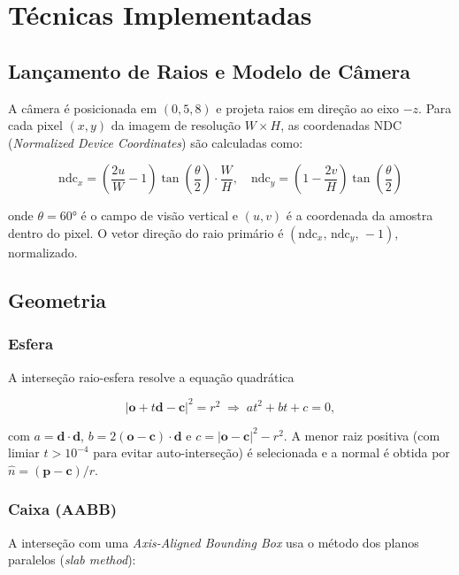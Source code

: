 \documentclass[12pt,a4paper]{article}
\begin{document}
\section{Técnicas Implementadas}

\subsection{Lançamento de Raios e Modelo de Câmera}

A câmera é posicionada em $(0, 5, 8)$ e projeta raios em direção ao
eixo $-z$. Para cada pixel $(x, y)$ da imagem de resolução
$W \times H$, as coordenadas NDC (\textit{Normalized Device Coordinates})
são calculadas como:

\[
  \text{ndc}_x = \left(\frac{2u}{W} - 1\right) \tan\!\left(\frac{\theta}{2}\right)\cdot\frac{W}{H},
  \quad
  \text{ndc}_y = \left(1 - \frac{2v}{H}\right) \tan\!\left(\frac{\theta}{2}\right)
\]

onde $\theta = 60°$ é o campo de visão vertical e $(u, v)$ é a
coordenada da amostra dentro do pixel. O vetor direção do raio primário
é $(\text{ndc}_x,\, \text{ndc}_y,\, -1)$, normalizado.

\subsection{Geometria}

\subsubsection{Esfera}

A interseção raio-esfera resolve a equação quadrática

\[
  |\mathbf{o} + t\mathbf{d} - \mathbf{c}|^2 = r^2
  \;\Rightarrow\;
  at^2 + bt + c = 0,
\]

com $a = \mathbf{d}\cdot\mathbf{d}$, $b = 2(\mathbf{o}-\mathbf{c})\cdot\mathbf{d}$ e
$c = |\mathbf{o}-\mathbf{c}|^2 - r^2$.
A menor raiz positiva (com limiar $t > 10^{-4}$ para evitar
auto-interseção) é selecionada e a normal é obtida por
$\hat{n} = (\mathbf{p} - \mathbf{c})/r$.

\subsubsection{Caixa (AABB)}

A interseção com uma \textit{Axis-Aligned Bounding Box} usa o
método dos planos paralelos (\textit{slab method}):
\end{document}

